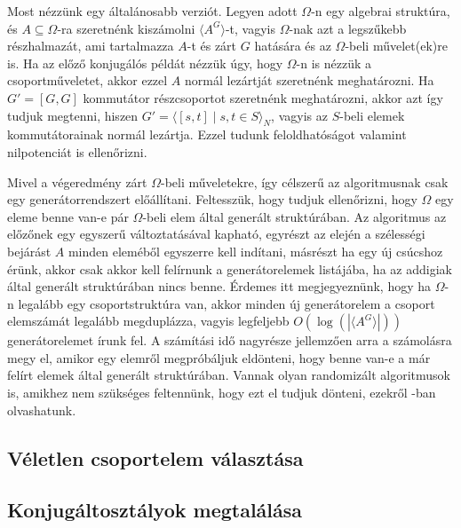 Most nézzünk egy általánosabb verziót.
Legyen adott $\Omega$-n egy algebrai struktúra, és $A \subseteq \Omega$-ra szeretnénk kiszámolni $\langle A^G \rangle$-t, vagyis
$\Omega$-nak azt a legszűkebb részhalmazát, ami tartalmazza $A$-t és zárt $G$ hatására és az $\Omega$-beli művelet(ek)re is.
Ha az előző konjugálós példát nézzük úgy, hogy $\Omega$-n is nézzük a csoportműveletet, akkor ezzel $A$ normál lezártját szeretnénk meghatározni.
Ha $G'=[G,G]$ kommutátor részcsoportot szeretnénk meghatározni,
akkor azt így tudjuk megtenni, hiszen $G'=\langle[s,t] \mid s,t \in S\rangle_N$, vagyis az $S$-beli elemek kommutátorainak normál lezártja.
Ezzel tudunk feloldhatóságot valamint nilpotenciát is ellenőrizni.

Mivel a végeredmény zárt $\Omega$-beli műveletekre, így célszerű az algoritmusnak csak egy generátorrendszert előállítani.
Feltesszük, hogy tudjuk ellenőrizni, hogy $\Omega$ egy eleme benne van-e pár $\Omega$-beli elem által generált struktúrában.
Az algoritmus az előzőnek egy egyszerű változtatásával kapható, egyrészt az elején a szélességi bejárást $A$ minden eleméből egyszerre kell indítani,
másrészt ha egy új csúcshoz érünk, akkor csak akkor kell felírnunk a generátorelemek listájába, ha az addigiak által generált struktúrában nincs benne.
Érdemes itt megjegyeznünk, hogy ha $\Omega$-n legalább egy csoportstruktúra van, akkor minden új generátorelem a csoport elemszámát legalább megduplázza,
vagyis legfeljebb $O(\log(|\langle A^G\rangle |))$ generátorelemet írunk fel. A számítási idő nagyrésze jellemzően arra a számolásra megy el, amikor egy elemről
megpróbáljuk eldönteni, hogy benne van-e a már felírt elemek által generált struktúrában. Vannak olyan randomizált algoritmusok is, amikhez nem szükséges feltennünk,
hogy ezt el tudjuk dönteni, ezekről \cite{Ser03}-ban olvashatunk.

\subsection{Véletlen csoportelem választása}
\label{subsec:veletlen}

\subsection{Konjugáltosztályok megtalálása}
\label{subsec:konj}
